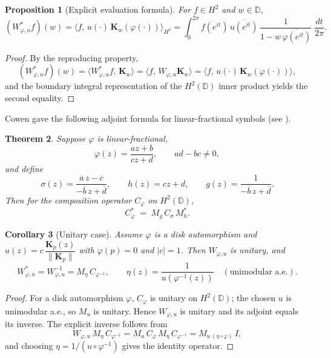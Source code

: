 \documentclass[11pt]{amsart}
\newtheorem{thm}{Theorem}[section]
\newtheorem{cor}[thm]{Corollary}
\newtheorem{prop}[thm]{Proposition}
\theoremstyle{definition}
\theoremstyle{remark}
\numberwithin{equation}{section}
\def\DD{{\mathbb D}}
\begin{document}
\begin{prop}[Explicit evaluation formula]\label{prop:pointwise-adjoint}
For $f\in H^2$ and $w\in\mathbb D$,
\[
(W_{\varphi, u}^* f)(w)
=\big\langle f,\, u(\cdot)\,\mathbf{K}_w(\varphi(\cdot))\big\rangle_{H^2}
=\int_{0}^{2\pi}
f(e^{it})\,\overline{ u(e^{it})}\,
\frac{1}{1-w\,\overline{\varphi(e^{it})}}\;\frac{dt}{2\pi}.
\]
\end{prop}

\begin{proof}
By the reproducing property,
\[
(W_{\varphi, u}^* f)(w)
=\langle W_{\varphi, u}^* f,\,\mathbf{K}_w\rangle
=\langle f,\,W_{\varphi, u}\mathbf{K}_w\rangle
=\langle f,\, u(\cdot)\,\mathbf{K}_w(\varphi(\cdot))\rangle,
\]
and the boundary integral representation of the $H^2(\DD)$ inner product yields the second equality.
\end{proof}

Cowen gave the following adjoint formula for linear-fractional symbols (see \cite[Thm.~9.2]{cowenmaccluer}).

\begin{thm} \label{thm:cowen}
Suppose $\varphi$ is linear-fractional,
\[
\varphi(z)=\frac{az+b}{cz+d},\qquad ad-bc\neq 0,
\]
and define
\[
\sigma(z)=\frac{\overline{a}\,z-\overline{c}}{-\overline{b}\,z+\overline{d}},
\qquad
h(z)=cz+d,
\qquad
g(z)=\frac{1}{-\overline{b}\,z+\overline{d}}.
\]
Then for the composition operator $C_\varphi$ on $H^2(\DD)$,
\[
C_\varphi^* \;=\; M_g\,C_\sigma\,M_h^*.
\]
\end{thm}


\begin{cor}[Unitary case]\label{cor:unitary}
Assume $\varphi$ is a disk automorphism and $ u(z)=c\,\dfrac{\mathbf{K}_p(z)}{\|\mathbf{K}_p\|}$ with $\varphi(p)=0$ and $|c|=1$. Then $W_{\varphi, u}$ is unitary, and
\[
W_{\varphi, u}^* = W_{\varphi, u}^{-1} = M_{\eta}\,C_{\varphi^{-1}},
\qquad
\eta(z)=\frac{1}{ u(\varphi^{-1}(z))}\quad (\text{unimodular a.e.}).
\]
\end{cor}

\begin{proof}
For a disk automorphism $\varphi$, $C_\varphi$ is unitary on $H^2(\DD)$; the chosen $ u$ is unimodular a.e., so $M_ u$ is unitary. Hence $W_{\varphi, u}$ is unitary and its adjoint equals its inverse. The explicit inverse follows from
\[
W_{\varphi, u}\,M_{\eta}\,C_{\varphi^{-1}}
= M_ u\,C_\varphi\,M_{\eta}\,C_{\varphi^{-1}}
= M_{ u\,(\eta\circ \varphi)}\,I,
\]
and choosing $\eta=1/( u\circ\varphi^{-1})$ gives the identity operator.
\end{proof}
\end{document}

